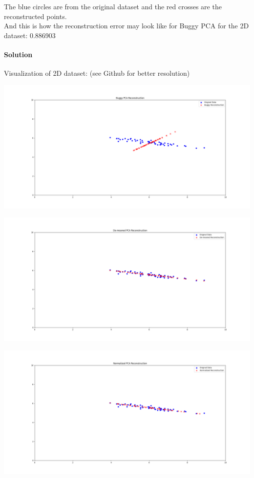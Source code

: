 \documentclass[a4paper]{article}
\theoremstyle{definition}
\newenvironment{soln}{
    \leavevmode\color{blue}\ignorespaces
}{}
\begin{document}
The blue circles are from the original dataset and the red crosses are the reconstructed points. \\

And this is how the reconstruction error may look like for Buggy PCA for the 2D dataset: 0.886903


\begin{soln}
  \paragraph{Solution}

  Visualization of 2D dataset: (see Github for better resolution)
  \begin{center}
    \includegraphics[width=\linewidth]{buggy_pca.png}

    \includegraphics[width=\linewidth]{demeaned_pca.png}

    \includegraphics[width=\linewidth]{normalized_pca.png}


\end{center}
\end{soln}
\end{document}
